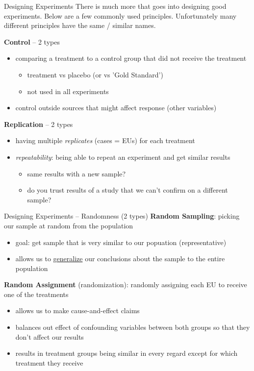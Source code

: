 \documentclass{beamer}
\begin{document}
\begin{frame}{Designing Experiments}
There is much more that goes into designing good experiments. Below are a few commonly used principles. Unfortunately many different principles have the same / similar names. \vspace{4mm}


\textbf{Control} -- 2 types
\begin{itemize}
    \item comparing a treatment to a control group that did not receive the treatment
        \begin{itemize}
            \item treatment vs placebo (or vs 'Gold Standard')
            \item not used in all experiments
        \end{itemize}
    \item control outside sources that might affect response (other variables)
\end{itemize} \vspace{4mm}

\textbf{Replication} -- 2 types
\begin{itemize}
    \item having multiple \textit{replicates} (cases = EUs) for each treatment
    \item \textit{repeatability}: being able to repeat an experiment and get similar results
        \begin{itemize}
            \item same results with a new sample?
            \item do you trust results of a study that we can't confirm on a different sample?
        \end{itemize}
\end{itemize}
\end{frame}



\begin{frame}{Designing Experiments -- Randomness (2 types)}
\textbf{Random Sampling}: picking our sample at random from the population
\begin{itemize}
    \item goal: get sample that is very similar to our popuation (representative)
    \item allows us to \underline{generalize} our conclusions about the sample to the entire population
\end{itemize} \vspace{4mm}

\textbf{Random Assignment} (randomization): randomly assigning each EU to receive one of the treatments
\begin{itemize}
    \item allows us to make cause-and-effect claims
    \item balances out effect of confounding variables between both groups so that they don't affect our results
    \item results in treatment groups being similar in every regard except for which treatment they receive
\end{itemize}
\end{frame}
\end{document}

